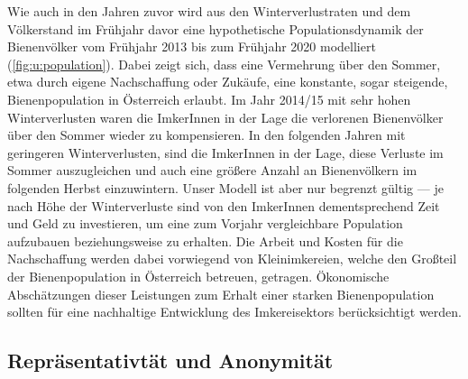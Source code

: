Wie auch in den Jahren zuvor wird aus den Winterverlustraten und dem Völkerstand im Frühjahr davor eine hypothetische Populationsdynamik der Bienenvölker vom Frühjahr 2013 bis zum Frühjahr 2020 modelliert (\cref{fig:u:population}). Dabei zeigt sich, dass eine Vermehrung über den Sommer, etwa durch eigene Nachschaffung oder Zukäufe, eine konstante, sogar steigende, Bienenpopulation in Österreich erlaubt.
\newline
Im Jahr 2014/15 mit sehr hohen Winterverlusten waren die ImkerInnen in der Lage die verlorenen Bienenvölker über den Sommer wieder zu kompensieren. In den folgenden Jahren mit geringeren Winterverlusten, sind die ImkerInnen in der Lage, diese Verluste im Sommer auszugleichen und auch eine größere Anzahl an Bienenvölkern im folgenden Herbst einzuwintern.
\newline
Unser Modell ist aber nur begrenzt gültig --- je nach Höhe der Winterverluste sind von den ImkerInnen dementsprechend Zeit und Geld zu investieren, um eine zum Vorjahr vergleichbare Population  aufzubauen beziehungsweise zu erhalten. Die Arbeit und Kosten für die Nachschaffung werden dabei vorwiegend von Kleinimkereien, welche den Großteil der Bienenpopulation in Österreich betreuen, getragen. Ökonomische Abschätzungen dieser Leistungen zum Erhalt einer starken Bienenpopulation sollten für eine nachhaltige Entwicklung des Imkereisektors berücksichtigt werden.

\subsection{Repräsentativtät und Anonymität}

